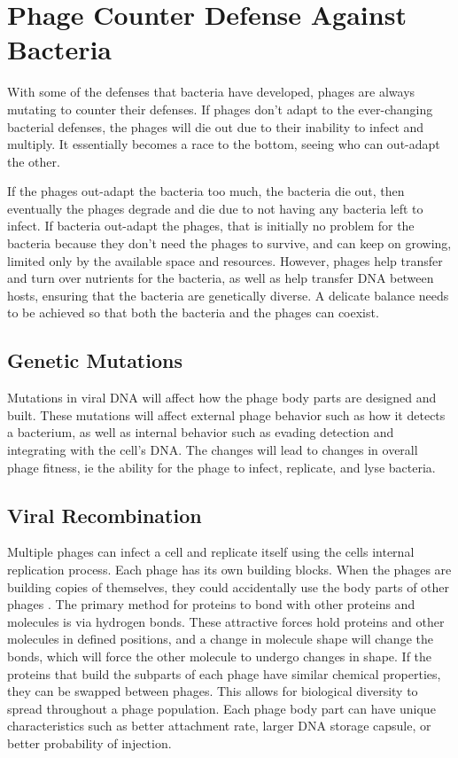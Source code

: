 \section{Phage Counter Defense Against Bacteria}
With some of the defenses that bacteria have developed, phages are always mutating to counter their defenses. 
If phages don't adapt to the ever-changing bacterial defenses, the phages will die out due to their inability to infect and multiply. 
It essentially becomes a race to the bottom, seeing who can out-adapt the other. 

If the phages out-adapt the bacteria too much, the bacteria die out, then eventually the phages degrade and die due to not having any bacteria left to infect. 
If bacteria out-adapt the phages, that is initially no problem for the bacteria because they don't need the phages to survive, and can keep on growing, limited only by the available space and resources. 
However, phages help transfer and turn over nutrients for the bacteria, as well as help transfer DNA between hosts, ensuring that the bacteria are genetically diverse. 
A delicate balance needs to be achieved so that both the bacteria and the phages can coexist. 

\subsection{Genetic Mutations}
Mutations in viral DNA will affect how the phage body parts are designed and built. 
These mutations will affect external phage behavior such as how it detects a bacterium, as well as internal behavior such as evading detection and integrating with the cell's DNA. 
The changes will lead to changes in overall phage fitness, ie the ability for the phage to infect, replicate, and lyse bacteria. 

\subsection{Viral Recombination}
Multiple phages can infect a cell and replicate itself using the cells internal replication process. 
Each phage has its own building blocks. 
When the phages are building copies of themselves, they could accidentally use the body parts of other phages \cite{aksyukBacteriophageAssembly2011}. 
The primary method for proteins to bond with other proteins and molecules is via hydrogen bonds. 
These attractive forces hold proteins and other molecules in defined positions, and a change in molecule shape will change the bonds, which will force the other molecule to undergo changes in shape. 
If the proteins that build the subparts of each phage have similar chemical properties, they can be swapped between phages. 
This allows for biological diversity to spread throughout a phage population. 
Each phage body part can have unique characteristics such as better attachment rate, larger DNA storage capsule, or better probability of injection. 

